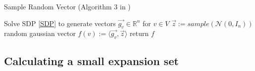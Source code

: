 \begin{algorithm}[htpb]
	\caption{Sample Random Vector (Algorithm 3 in \cite{ChanLTZ16}) \label{alg:sample_random_vector}} 
	\begin{algorithmic}
		\State Solve SDP \ref{SDP} to generate vectors $\vec{g_v} \in \mathbb{R}^n $ for $v \in V$
		\State $\vec{z} := sample(\mathcal{N}(0,I_n))$\Comment random gaussian vector
		\State $f(v) := \langle \vec{g_v}, \vec{z} \rangle$
		\EndFor
		\State return $f$
		\EndFunction 
	\end{algorithmic}
\end{algorithm}	

\subsection{Calculating a small expansion set}

